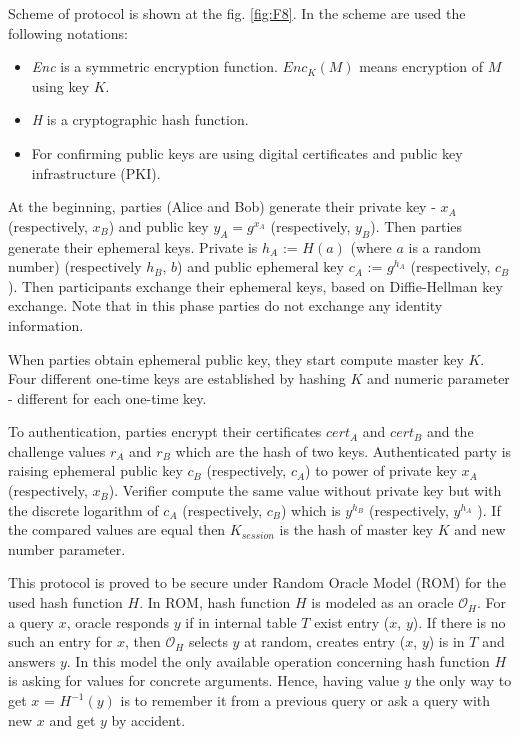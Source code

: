 \documentclass[11pt,titlepage]{article}
\theoremstyle{plain}
\begin{document}
Scheme of protocol is shown at the fig. \ref{fig:F8}. In the scheme are used the following notations:
\begin{itemize}
\item \textit{Enc} is a symmetric encryption function. \textit{$Enc_K(M)$} means encryption of $M$ using key $K$. 
\item \textit{H} is a cryptographic hash function. 
\item For confirming public keys are using digital certificates and public key infrastructure (PKI).
\end{itemize}


At the beginning, parties (Alice and Bob) generate their private key - $x_A$ (respectively, $x_B$) and public key $y_A = g^{x_A}$ (respectively, $y_B$). Then parties generate their ephemeral keys. Private is $h_A$ := $H(a)$ (where $a$ is a random number) (respectively $h_B$, $b$) and public ephemeral key $c_A$ := $g^{h_A}$ (respectively, $c_B$). Then participants exchange their ephemeral keys, based on Diffie-Hellman key exchange. Note that in this phase parties do not exchange any identity information.

\vspace{5mm}

When parties obtain ephemeral public key, they start compute master
key $K$. Four different one-time keys are established by hashing $K$ and numeric parameter - different for each one-time key.

\vspace{5mm}

To authentication, parties encrypt their certificates $cert_A$ and $cert_B$ and the challenge values $r_A$ and $r_B$ which are the hash of two keys. Authenticated party is raising ephemeral public key $c_B$ (respectively, $c_A$) to power of private key $x_A$ (respectively, $x_B$). Verifier compute the same value without private key but with the discrete logarithm of $c_A$ (respectively, $c_B$) which is $y^{h_B}$ (respectively, $y^{h_A}$ ). If the compared values are equal then $K_{session}$ is the hash of master key $K$ and new number parameter.

\vspace{5mm}

This protocol is proved to be secure under Random Oracle Model (ROM) for the used
hash function $H$. In ROM, hash function $H$ is modeled as an oracle $\mathcal{O}_H$. For a query $x$, oracle responds $y$ if in internal table $T$ exist entry ($x$, $y$). If there is no such an entry for $x$, then $\mathcal{O}_H$ selects $y$ at random, creates entry ($x$, $y$) is in $T$ and answers $y$. In this model the only available operation concerning hash function $H$ is asking for values for concrete arguments. Hence, having value $y$ the only way to get $x$ = $H^{-1}(y)$ is to remember it from a previous query or ask a query with new $x$ and get $y$ by accident. 
\end{document}
